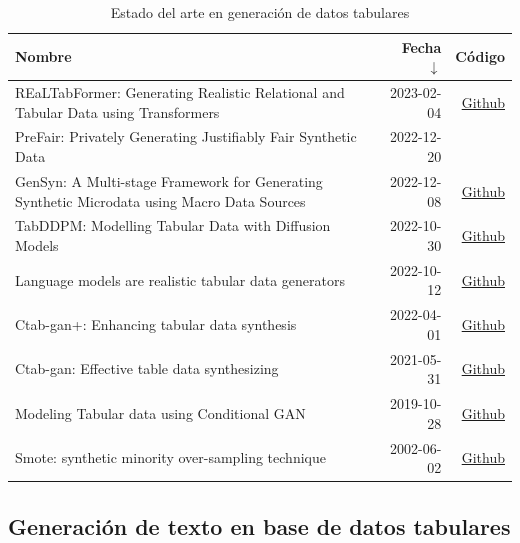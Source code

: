 \begin{table}[H]
	\centering
	\caption{Estado del arte en generación de datos tabulares}
	\label{tab-sota-tab}
    \begin{tabular}{|m{28em}|r|r|}
    \hline
    \rowcolor[gray]{0.8}
    Nombre & Fecha $\downarrow$ & Código \\
    \hline
    REaLTabFormer: Generating Realistic Relational and Tabular Data using Transformers \cite{solatorio_realtabformer_2023}
    & 2023-02-04 & \href{https://github.com/avsolatorio/REaLTabFormer}{Github} \\
    \hline
    PreFair: Privately Generating Justifiably Fair Synthetic Data \cite{pujol_prefair_2022}
    & 2022-12-20 & \\
    \hline
    GenSyn: A Multi-stage Framework for Generating Synthetic Microdata using Macro Data Sources \cite{acharya_gensyn_2022}
    & 2022-12-08 & \href{https://github.com/Angeela03/GenSyn}{Github} \\
    \hline
    TabDDPM: Modelling Tabular Data with Diffusion Models \cite{kotelnikov_tabddpm_2022}
    & 2022-10-30 & \href{https://github.com/rotot0/tab-ddpm}{Github} \\
    \hline
    Language models are realistic tabular data generators \cite{borisov_language_2022}
    & 2022-10-12 & \href{https://github.com/kathrinse/be_great}{Github} \\
    \hline
    Ctab-gan+: Enhancing tabular data synthesis \cite{zhao_ctab-gan_2022}
    & 2022-04-01 & \href{https://github.com/Team-TUD/CTAB-GAN-Plus}{Github} \\
    \hline
    Ctab-gan: Effective table data synthesizing \cite{zhao_ctab-gan_2021}
    & 2021-05-31 & \href{https://github.com/Team-TUD/CTAB-GAN}{Github} \\
    \hline
    Modeling Tabular data using Conditional GAN \cite{xu_modeling_2019}
    & 2019-10-28 & \href{https://github.com/sdv-dev/SDV}{Github} \\
    \hline
    Smote: synthetic minority over-sampling technique \cite{chawla_smote_2002}
    & 2002-06-02 & \href{https://github.com/scikit-learn-contrib/imbalanced-learn}{Github} \\
    \hline
    \end{tabular}
\end{table}


\subsection{Generación de texto en base de datos tabulares}

